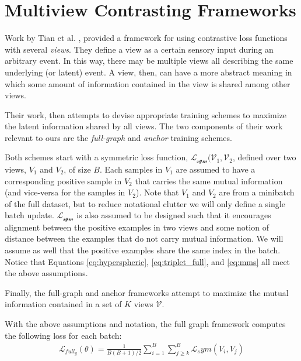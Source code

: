 \section{Multiview Contrasting Frameworks}
\label{section:multiview_framework}
Work by Tian et al. \cite{tian2020contrastive}, provided a framework for using contrastive loss functions with several \textit{views}.
They define a view as a certain sensory input during an arbitrary event.  
In this way, there may be multiple views all describing the same underlying (or latent) event.
A view, then, can have a more abstract meaning in which some amount of information contained in the view is shared among other views.

Their work, then attempts to devise appropriate training schemes to maximize the latent information shared by all views.
The two components of their work relevant to ours are the \textit{full-graph} and \textit{anchor} training schemes.

Both schemes start with a symmetric loss function, $\mathcal{L_{sym}(V_1,V_2}$, defined over two views, $V_1$ and $V_2$, of size $B$.
Each samples in $V_1$ are assumed to have a corresponding positive sample in $V_2$ that carries the same mutual information (and vice-versa for the samples in $V_2$).
Note that $V_1$ and $V_2$ are from a minibatch of the full dataset, but to reduce notational clutter we will only define a single batch update.
$\mathcal{L_{sym}}$ is also assumed to be designed such that it encourages alignment between the positive examples in two views and some notion of distance between the examples that do not carry mutual information.
We will assume as well that the positive examples share the same index in the batch. 
Notice that Equations \ref{eq:hyperspheric}, \ref{eq:triplet_full}, and \ref{eq:mms} all meet the above assumptions.

Finally, the full-graph and anchor frameworks attempt to maximize the mutual information contained in a set of $K$ views $\mathcal{V}$.

With the above assumptions and notation, the full graph framework computes the following loss for each batch:
\begin{align*}
    \mathcal{L}_{full_g}(\theta) = \frac{1}{B(B+1)/2}\sum_{i=1}^B \sum_{j\geq k}^B \mathcal{L}_sym(V_i, V_j)
\end{align*}


